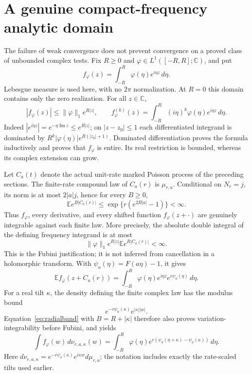 \documentclass[11pt]{article}
\newcommand{\C}{\mathbb C}\newcommand{\R}{\mathbb R}
\newcommand{\E}{\mathbb E}\newcommand{\Pp}{\mathbb P}
\begin{document}
\section{A genuine compact-frequency analytic domain}
The failure of weak convergence does not prevent convergence on a proved
class of unbounded complex tests. Fix $R\geq0$ and
$\varphi\in L^1([-R,R];\C)$, and put
\[
 f_\varphi(z)=\int_{-R}^R\varphi(\eta)e^{i\eta z}\,d\eta.
\]
Lebesgue measure is used here, with no $2\pi$ normalization. At $R=0$
this domain contains only the zero realization. For all $z\in\C$,
\begin{equation}\label{eq:bandbound}
 |f_\varphi(z)|\leq\|\varphi\|_1 e^{R|z|},\qquad
 f_\varphi^{(k)}(z)=\int_{-R}^R(i\eta)^k\varphi(\eta)e^{i\eta z}\,d\eta.
\end{equation}
Indeed $|e^{i\eta z}|=e^{-\eta\operatorname{Im}z}\leq e^{R|z|}$;
on $|z-z_0|\leq1$ each differentiated integrand is dominated by
$R^k|\varphi(\eta)|e^{R(|z_0|+1)}$. Dominated differentiation proves
the formula inductively and proves that $f_\varphi$ is entire. Its
real restriction is bounded, whereas its complex extension can grow.

Let $C_a(t)$ denote the actual unit-rate marked Poisson process of the
preceding sections. The finite-rate compound law of $C_a(r)$ is
$\mu_{r,a}$. Conditional on $N_r=j$, its norm is at most $2|a|j$, hence
for every $B\geq0$,
\begin{equation}\label{eq:radialband}
 \E e^{B|C_a(r)|}\leq
 \exp\{r(e^{2B|a|}-1)\}<\infty.
\end{equation}
Thus $f_\varphi$, every derivative, and every shifted function
$f_\varphi(z+\cdot)$ are genuinely integrable against each finite law.
More precisely, the absolute double integral of the defining frequency
integrand is at most
\[
 \|\varphi\|_1 e^{R|z|}\E e^{R|C_a(r)|}<\infty.
\]
This is the Fubini justification; it is not inferred from cancellation
in a holomorphic transform. With $\psi_a(\eta)=F(a\eta)-1$, it gives
\begin{equation}\label{eq:bandexpect}
 \E f_\varphi(z+C_a(r))
 =\int_{-R}^R\varphi(\eta)e^{i\eta z}e^{r\psi_a(\eta)}\,d\eta.
\end{equation}
For a real tilt $\kappa$, the density defining the finite complex law
has the modulus bound
\[
 e^{-r\psi_a(\kappa)}e^{|\kappa||w|}.
\]
Equation~\eqref{eq:radialband} with $B=R+|\kappa|$ therefore also
proves variation-integrability before Fubini, and yields
\begin{equation}\label{eq:bandtilt}
 \int f_\varphi(w)\,d\nu_{r,a,\kappa}(w)
 =\int_{-R}^R\varphi(\eta)
 e^{r(\psi_a(\eta+\kappa)-\psi_a(\kappa))}\,d\eta.
\end{equation}
Here $d\nu_{r,a,\kappa}=e^{-r\psi_a(\kappa)}e^{i\kappa w}d\mu_{r,a}$;
the notation includes exactly the rate-scaled tilts used earlier.
\end{document}
